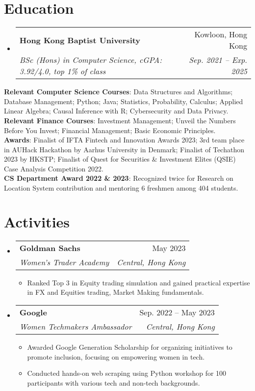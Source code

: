 \documentclass[letterpaper,10pt]{article}
\makeatletter
\newcommand{\resumeItem}[1]{
  \item\small{
    {#1 \vspace{-2pt}}
  }
}
\newcommand{\resumeSubheading}[4]{
  \vspace{-2pt}\item
    \begin{tabular*}{1\textwidth}[t]{l@{\extracolsep{\fill}}r}
      \textbf{#1} & #2 \\
      \textit{\small#3} & \textit{\small #4} \\
    \end{tabular*}\vspace{-7pt}
}
\newcommand{\resumeSubHeadingListStart}{\begin{itemize}[leftmargin=0.0in, label={}]}
\newcommand{\resumeSubHeadingListEnd}{\end{itemize}}
\newcommand{\resumeItemListStart}{\begin{itemize}}
\newcommand{\resumeItemListEnd}{\end{itemize}\vspace{-5pt}}
\makeatother
\begin{document}
\section{Education}
  \resumeSubHeadingListStart
    \resumeSubheading
      {Hong Kong Baptist University}{Kowloon, Hong Kong}
      {BSc (Hons) in Computer Science, cGPA: 3.92/4.0, top 1\% of class}{Sep. 2021 -- Exp. 2025}
  \resumeSubHeadingListEnd
   \begin{itemize}[leftmargin=0.0in, label={}]
    \small{\item{
     \textbf{Relevant Computer Science Courses}{: Data Structures and Algorithms; Database Management; Python; Java; Statistics, Probability, Calculus; Applied Linear Algebra; Causal Inference with R; Cybersecurity and Data Privacy.} \\
     \textbf{Relevant Finance Courses}{: Investment Management; Unveil the Numbers Before You Invest; Financial Management; Basic Economic Principles.} \\
     \textbf{Awards}{: Finalist of IFTA Fintech and Innovation Awards 2023; 3rd team place in AUHack Hackathon by Aarhus University in Denmark; Finalist of Techathon 2023 by HKSTP; Finalist of Quest for Securities \& Investment Elites (QSIE) Case Analysis Competition 2022.} \\
     \textbf{CS Department Award 2022 \& 2023}{: Recognized twice for Research on Location System contribution and mentoring 6 freshmen among 404 students.} \\
    }}
 \end{itemize}

\section{Activities}
  \resumeSubHeadingListStart
    \resumeSubheading
      {Goldman Sachs}{May 2023}
      {Women’s Trader Academy}{Central, Hong Kong}
      \resumeItemListStart
        \resumeItem{Ranked Top 3 in Equity trading simulation and gained practical expertise in FX and Equities trading, Market Making fundamentals.}
      \resumeItemListEnd
       \resumeSubheading
      {Google}{Sep. 2022 -- May 2023}
      {Women Techmakers Ambassador}{Central, Hong Kong}
      \resumeItemListStart
        \resumeItem{Awarded Google Generation Scholarship for organizing initiatives to promote inclusion, focusing on empowering women in tech.}
        \resumeItem{Conducted hands-on web scraping using Python workshop for 100 participants with various tech and non-tech backgrounds. }
      \resumeItemListEnd
\resumeSubHeadingListEnd
      
\end{document}
